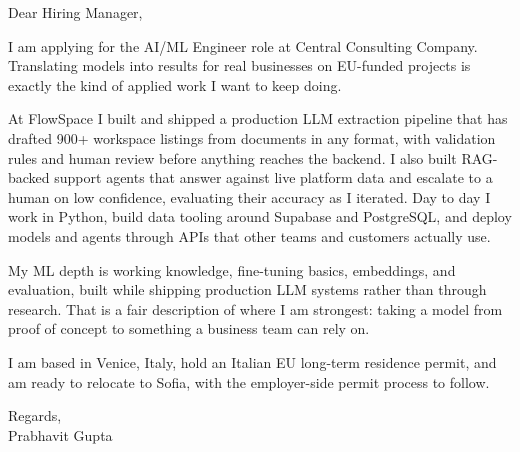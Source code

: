 \documentclass[a4paper,11pt]{article}
\begin{document}
Dear Hiring Manager,

I am applying for the AI/ML Engineer role at Central Consulting Company. Translating models into results for real businesses on EU-funded projects is exactly the kind of applied work I want to keep doing.

At FlowSpace I built and shipped a production LLM extraction pipeline that has drafted 900+ workspace listings from documents in any format, with validation rules and human review before anything reaches the backend. I also built RAG-backed support agents that answer against live platform data and escalate to a human on low confidence, evaluating their accuracy as I iterated. Day to day I work in Python, build data tooling around Supabase and PostgreSQL, and deploy models and agents through APIs that other teams and customers actually use.

My ML depth is working knowledge, fine-tuning basics, embeddings, and evaluation, built while shipping production LLM systems rather than through research. That is a fair description of where I am strongest: taking a model from proof of concept to something a business team can rely on.

I am based in Venice, Italy, hold an Italian EU long-term residence permit, and am ready to relocate to Sofia, with the employer-side permit process to follow.

Regards,\\
Prabhavit Gupta
\end{document}
